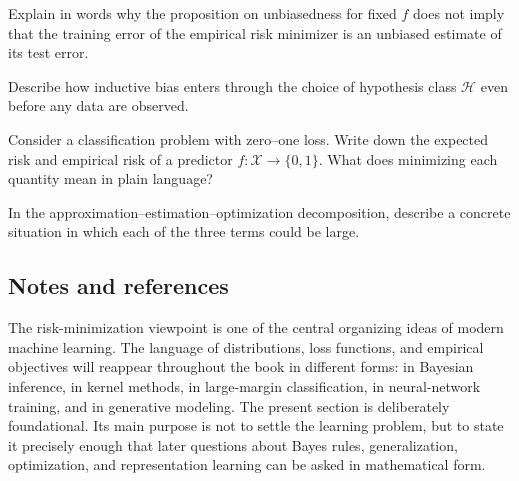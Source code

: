 \begin{exercise}
Explain in words why the proposition on unbiasedness for fixed $f$ does not imply that the training error of the empirical risk minimizer is an unbiased estimate of its test error.
\end{exercise}

\begin{exercise}
Describe how inductive bias enters through the choice of hypothesis class $\mathcal H$ even before any data are observed.
\end{exercise}

\begin{exercise}
Consider a classification problem with zero--one loss. Write down the expected risk and empirical risk of a predictor $f:\mathcal X\to\{0,1\}$. What does minimizing each quantity mean in plain language?
\end{exercise}

\begin{exercise}
In the approximation--estimation--optimization decomposition, describe a concrete situation in which each of the three terms could be large.
\end{exercise}

\subsection*{Notes and references}

The risk-minimization viewpoint is one of the central organizing ideas of modern machine learning. The language of distributions, loss functions, and empirical objectives will reappear throughout the book in different forms: in Bayesian inference, in kernel methods, in large-margin classification, in neural-network training, and in generative modeling. The present section is deliberately foundational. Its main purpose is not to settle the learning problem, but to state it precisely enough that later questions about Bayes rules, generalization, optimization, and representation learning can be asked in mathematical form.